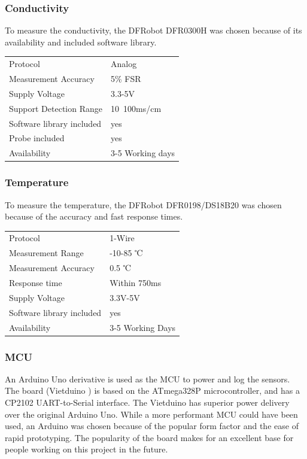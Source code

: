 \subsubsection{Conductivity}
To measure the conductivity, the DFRobot DFR0300H \cite{DFR0300H} was chosen because of its availability and included software library.
\begin{table}[h!]
	\centering
	\quad
	\begin{tabular}{| l | l |}
    \hline
    Protocol & Analog\\
    Measurement Accuracy &  5\% \gls{FSR}\\
    Supply Voltage & 3.3-5V\\
    Support Detection Range & 10~100ms/cm\\
    Software library included & yes \\
    Probe included & yes \\
    Availability & 3-5 Working days \\
    \hline
	\end{tabular}
\end{table}

\newpage
\subsubsection{Temperature}
To measure the temperature, the DFRobot DFR0198/DS18B20 \cite{DFR0198} was chosen because of the accuracy and fast response times.
\begin{table}[h!]
	\centering
	\quad
	\begin{tabular}{| l | l |}
    \hline
    Protocol & 1-Wire\\
    Measurement Range & -10-85 ℃ \\
    Measurement Accuracy &  0.5 ℃ \\
    Response time & Within 750\gls{ms} \\
    Supply Voltage & 3.3V-5V \\
    Software library included & yes \\
    Availability & 3-5 Working Days \\
    \hline
	\end{tabular}
\end{table}

\subsubsection{MCU} \label{mcu}
An Arduino Uno derivative is used as the \gls{MCU} to power and log the sensors. The board  (Vietduino \cite{vietduino}) is based on the ATmega328P microcontroller, and has a CP2102 \gls{UART}-to-Serial interface. The Vietduino has superior power delivery over the original Arduino Uno. While a more performant MCU could have been used, an Arduino was chosen because of the popular form factor and the ease of rapid prototyping. The popularity of the board makes for an excellent base for people working on this project in the future.

